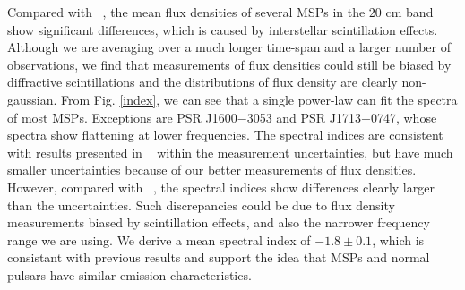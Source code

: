 \documentclass[useAMS,usenatbib]{mn2e}
\begin{document}
Compared with ~\citet{Yan11}, the mean flux densities of several MSPs in the $20$ cm 
band show significant differences, which is caused by interstellar scintillation effects.
%
Although we are averaging over a much longer time-span and a larger number of observations, 
we find that measurements of flux densities could still be biased by diffractive 
scintillations and the distributions of flux density are clearly non-gaussian.
%
From Fig. \ref{index}, we can see that a single power-law can fit the spectra 
of most MSPs. Exceptions are PSR J1600$-$3053 and PSR J1713$+$0747, whose spectra show 
flattening at lower frequencies.
%
The spectral indices are consistent with results presented in ~\citet{Toscano98} within 
the measurement uncertainties, but have much smaller uncertainties because of our 
better measurements of flux densities. 
%
However, compared with ~\citet{Kramer99}, the spectral indices show differences 
clearly larger than the uncertainties.
%
Such discrepancies could be due to flux density measurements biased by scintillation 
effects, and also the narrower frequency range we are using.
%
We derive a mean spectral index of $-1.8\pm0.1$, which is consistant with previous 
results and support the idea that MSPs and normal pulsars have similar emission 
characteristics.
%
\end{document}
